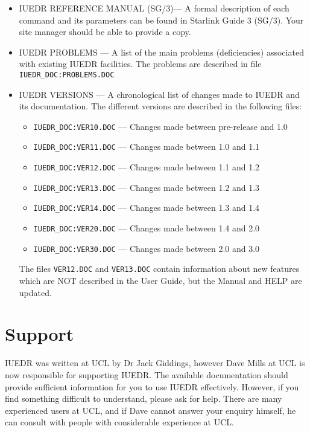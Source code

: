 \begin {itemize}

\item IUEDR REFERENCE MANUAL (SG/3)--- A formal description of each
command and its parameters can be found in Starlink Guide 3 (SG/3).
Your site manager should be able to provide a copy.

\item IUEDR PROBLEMS --- A list of the main problems (deficiencies)
associated with existing IUEDR facilities. The problems are described
in file {\tt IUEDR\_DOC:PROBLEMS.DOC}

\item IUEDR VERSIONS --- A chronological list of changes made to IUEDR
and its documentation. The different versions are described in the
following files:

\begin {itemize}
\item {\tt IUEDR\_DOC:VER10.DOC} --- Changes made between pre-release and 1.0
\item {\tt IUEDR\_DOC:VER11.DOC} --- Changes made between 1.0 and 1.1
\item {\tt IUEDR\_DOC:VER12.DOC} --- Changes made between 1.1 and 1.2
\item {\tt IUEDR\_DOC:VER13.DOC} --- Changes made between 1.2 and 1.3
\item {\tt IUEDR\_DOC:VER14.DOC} --- Changes made between 1.3 and 1.4
\item {\tt IUEDR\_DOC:VER20.DOC} --- Changes made between 1.4 and 2.0
\item {\tt IUEDR\_DOC:VER30.DOC} --- Changes made between 2.0 and 3.0
\end {itemize}

The files {\tt VER12.DOC} and {\tt VER13.DOC} contain information about new
features which  are NOT described in the User Guide, but the Manual
and HELP are updated.

\end {itemize}

\section {Support}

IUEDR was written at UCL by Dr Jack Giddings, however Dave Mills at
UCL is now  responsible for supporting IUEDR.  The available
documentation should provide sufficient information for you to  use
IUEDR effectively. However, if you find something difficult to
understand,  please ask for help. There are many experienced users at
UCL, and if Dave cannot answer your enquiry himself, he can consult
with people with  considerable experience at UCL.

